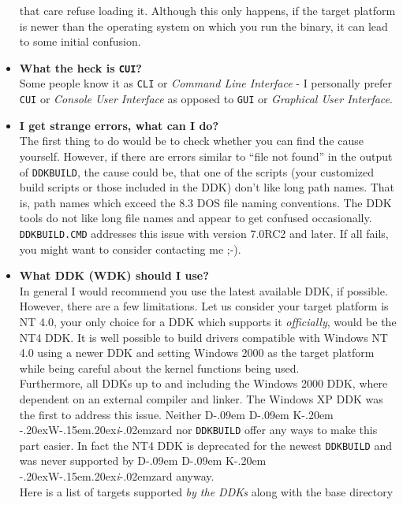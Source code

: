 \documentclass[a4paper,titlepage]{report}
\def\ddkwiz{D\kern-.09em D\kern-.09em K\kern-.20em \raise-.20ex\hbox{W}\kern-.15em\raise.20ex\hbox{\it{i}}\kern-.02em{zard}}
\begin{document}
\begin{itemize}
        that care refuse loading it. Although this only happens, if the target platform
        is newer than the operating system on which you run the binary, it can lead
        to some initial confusion.
  \item \textbf{What the heck is \texttt{CUI}?}\\
        Some people know it as \texttt{CLI} or \emph{Command Line Interface} - I
        personally prefer \texttt{CUI} or \emph{Console User Interface} as opposed
        to \texttt{GUI} or \emph{Graphical User Interface}.
  \item \textbf{I get strange errors, what can I do?}\\
        The first thing to do would be to check whether you can find the cause yourself.
        However, if there are errors similar to ``file not found'' in the output of
        \texttt{DDKBUILD}, the cause could be, that one of the scripts (your customized
        build scripts or those included in the DDK) don't like long path names. That is,
        path names which exceed the 8.3 DOS file naming conventions. The DDK tools do not
        like long file names and appear to get confused occasionally. \texttt{DDKBUILD.CMD}
        addresses this issue with version 7.0RC2 and later. If all fails, you might want to
        consider contacting me \textsf{;-)}.
  \item {}
        \textbf{What DDK (WDK) should I use?}\\
        In general I would recommend you use the latest available DDK, if possible. However,
        there are a few limitations. Let us consider your target platform is NT 4.0, your
        only choice for a DDK which supports it \emph{officially}, would be the NT4 DDK.
        It is well possible to build drivers compatible with Windows NT 4.0 using a newer
        DDK and setting Windows 2000 as the target platform while being careful about
        the kernel functions being used.\\
        Furthermore, all DDKs up to and including the Windows 2000 DDK, where dependent
        on an external compiler and linker. The Windows XP DDK was the first to address
        this issue. Neither \ddkwiz{} nor \texttt{DDKBUILD} offer any ways to make this
        part easier.
        In fact the NT4 DDK is deprecated for the newest \texttt{DDKBUILD} and was never
        supported by \ddkwiz{} anyway.\\
        Here is a list of targets supported \emph{by the DDKs} along with the base directory

\end{itemize}
\end{document}
